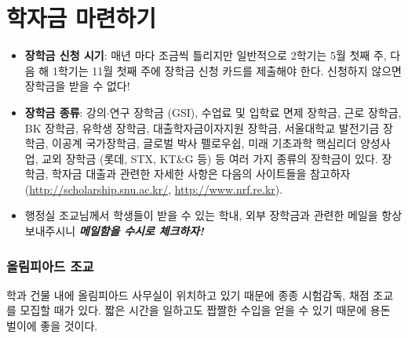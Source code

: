 \section{학자금 마련하기}
\begin{itemize}
\item \textbf{장학금 신청 시기}: 매년 마다 조금씩 틀리지만 일반적으로 2학기는 5월 첫째 주, 다음 해 1학기는 11월 첫째 주에 장학금 신청 카드를 제출해야 한다. 신청하지 않으면 장학금을 받을 수 없다!
\item \textbf{장학금 종류}: 강의$\cdot$연구 장학금 (GSI), 수업료 및 입학료 면제 장학금, 근로 장학금, BK 장학금, 유학생 장학금, 대출학자금이자지원 장학금, 서울대학교 발전기금 장학금, 이공계 국가장학금, 글로벌 박사 펠로우쉽, 미래 기초과학 핵심리더 양성사업, 교외 장학금 (롯데, STX, KT\&G 등) 등 여러 가지 종류의 장학금이 있다. 장학금, 학자금 대출과 관련한 자세한 사항은 다음의 사이트들을 참고하자 (\url{http://scholarship.snu.ac.kr/}, \url{http://www.nrf.re.kr}).
\item 행정실 조교님께서 학생들이 받을 수 있는 학내, 외부 장학금과 관련한 메일을 항상 보내주시니 \textbf{\emph{메일함을 수시로 체크하자!}}
\end{itemize}

\subsubsection{올림피아드 조교}
학과 건물 내에 올림피아드 사무실이 위치하고 있기 때문에 종종 시험감독, 채점 조교를 모집할 때가 있다. 짧은 시간을 일하고도 짭짤한 수입을 얻을 수 있기 때문에 용돈 벌이에 좋을 것이다.


